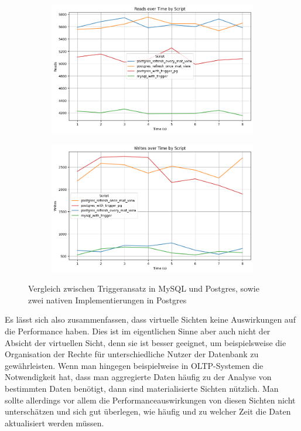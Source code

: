 \begin{figure}[H]
    \centering
    \begin{subfigure}[t]{0.48\textwidth}
        \includegraphics[width=\textwidth]{PNGs/Script/Views/mat-view-comparison//Reads}
    \end{subfigure}
    \hfill
    \begin{subfigure}[t]{0.48\textwidth}
        \includegraphics[width=\textwidth]{PNGs/Script/Views/mat-view-comparison/Writes}
    \end{subfigure}
    \vspace{-20pt}
    \caption[Views: Beide Triggeransätze sowie materialisierte Sicht]{Vergleich zwischen Triggeransatz in MySQL und Postgres, sowie zwei nativen Implementierungen in Postgres }
    \label{fig:mat-view-comparison-comp-metric}
\end{figure}
\vspace{-12pt}

Es lässt sich also zusammenfassen, dass virtuelle Sichten keine Auswirkungen auf die Performance haben.
Dies ist im eigentlichen Sinne aber auch nicht der Absicht der virtuellen Sicht, denn sie ist besser geeignet, um beispielsweise die Organisation der Rechte für unterschiedliche Nutzer der Datenbank zu gewährleisten.
Wenn man hingegen beispielweise in OLTP-Systemen die Notwendigkeit hat, dass man aggregierte Daten häufig zu der Analyse von bestimmten Daten benötigt, dann sind materialisierte Sichten nützlich.
Man sollte allerdings vor allem die Performanceauswirkungen von diesen Sichten nicht unterschätzen und sich gut überlegen, wie häufig und zu welcher Zeit die Daten aktualisiert werden müssen.